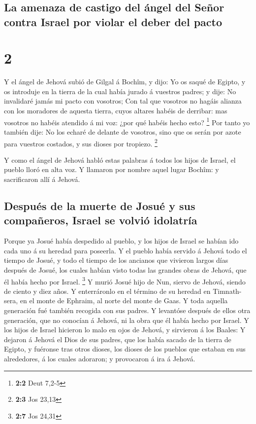 \hypertarget{la-amenaza-de-castigo-del-uxe1ngel-del-seuxf1or-contra-israel-por-violar-el-deber-del-pacto}{%
\subsection{La amenaza de castigo del ángel del Señor contra Israel por
violar el deber del
pacto}\label{la-amenaza-de-castigo-del-uxe1ngel-del-seuxf1or-contra-israel-por-violar-el-deber-del-pacto}}

\hypertarget{section-1}{%
\section{2}\label{section-1}}

 Y el ángel de Jehová subió de Gilgal á Bochîm, y dijo: Yo
os saqué de Egipto, y os introduje en la tierra de la cual había jurado
á vuestros padres; y dije: No invalidaré jamás mi pacto con vosotros;
 Con tal que vosotros no hagáis alianza con los moradores de
aquesta tierra, cuyos altares habéis de derribar: mas vosotros no habéis
atendido á mi voz: ¿por qué habéis hecho esto? \footnote{\textbf{2:2}
  Deut 7,2-5}  Por tanto yo también dije: No los echaré de
delante de vosotros, sino que os serán por azote para vuestros costados,
y sus dioses por tropiezo. \footnote{\textbf{2:3} Jos 23,13}

 Y como el ángel de Jehová habló estas palabras á todos los
hijos de Israel, el pueblo lloró en alta voz.  Y llamaron
por nombre aquel lugar Bochîm: y sacrificaron allí á Jehová.

\hypertarget{despuuxe9s-de-la-muerte-de-josuuxe9-y-sus-compauxf1eros-israel-se-volviuxf3-idolatruxeda}{%
\subsection{Después de la muerte de Josué y sus compañeros, Israel se
volvió
idolatría}\label{despuuxe9s-de-la-muerte-de-josuuxe9-y-sus-compauxf1eros-israel-se-volviuxf3-idolatruxeda}}

 Porque ya Josué había despedido al pueblo, y los hijos de
Israel se habían ido cada uno á su heredad para poseerla.  Y
el pueblo había servido á Jehová todo el tiempo de Josué, y todo el
tiempo de los ancianos que vivieron largos días después de Josué, los
cuales habían visto todas las grandes obras de Jehová, que él había
hecho por Israel. \footnote{\textbf{2:7} Jos 24,31}  Y murió
Josué hijo de Nun, siervo de Jehová, siendo de ciento y diez años.
 Y enterráronlo en el término de su heredad en Timnath-sera,
en el monte de Ephraim, al norte del monte de Gaas.  Y toda
aquella generación fué también recogida con sus padres. Y levantóse
después de ellos otra generación, que no conocían á Jehová, ni la obra
que él había hecho por Israel.  Y los hijos de Israel
hicieron lo malo en ojos de Jehová, y sirvieron á los Baales:
 Y dejaron á Jehová el Dios de sus padres, que los había
sacado de la tierra de Egipto, y fuéronse tras otros dioses, los dioses
de los pueblos que estaban en sus alrededores, á los cuales adoraron; y
provocaron á ira á Jehová.

